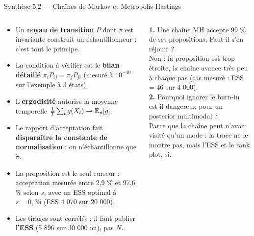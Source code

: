\begin{frame}{Synthèse 5.2 --- Chaînes de Markov et Metropolis-Hastings}
\footnotesize
\begin{columns}[t]
\begin{column}{0.49\textwidth}
\begin{tcolorbox}[enhanced,colback=byPurple!7,colframe=byPurple,arc=2mm,
   title={\bfseries\color{white}\faLightbulb\ Synthèse},colbacktitle=byPurple,
   attach boxed title to top left={xshift=3mm,yshift=-2mm},
   boxed title style={arc=1mm,boxrule=0pt}]
\begin{itemize}
  \item Un \textbf{noyau de transition} $P$ dont $\pi$ est invariante construit un
        échantillonneur : c'est tout le principe.
  \item La condition à vérifier est le \textbf{bilan détaillé}
        $\pi_iP_{ij} = \pi_jP_{ji}$ (mesuré à $10^{-10}$ sur l'exemple à 3 états).
  \item L'\textbf{ergodicité} autorise la moyenne temporelle
        $\frac1T\sum_t g(X_t) \to \mathbb{E}_\pi[g]$.
  \item Le rapport d'acceptation fait \textbf{disparaître la constante de
        normalisation} : on n'échantillonne que $\tilde\pi$.
  \item La proposition est le seul curseur : acceptation mesurée entre 2,9 \% et
        97,6 \% selon $s$, avec un ESS optimal à $s = 0{,}35$ (ESS 4 070 sur 20 000).
  \item Les tirages sont corrélés : il faut publier l'\textbf{ESS} (5 896 sur
        30 000 ici), pas $N$.
\end{itemize}
\end{tcolorbox}
\end{column}
\begin{column}{0.49\textwidth}
\begin{qbox}
\textbf{1.} Une chaîne MH accepte 99 \% de ses propositions. Faut-il s'en réjouir ?
\\ \footnotesize Non : la proposition est trop étroite, la chaîne avance très peu
à chaque pas (cas mesuré : ESS = 46 sur 4 000).\\[0.3mm]
\textbf{2.} Pourquoi ignorer le burn-in est-il dangereux pour un posterior
multimodal ? \\ \footnotesize Parce que la chaîne peut n'avoir visité qu'un mode :
la trace ne le montre pas, mais l'ESS et le rank plot, si.
\end{qbox}
\end{column}
\end{columns}
\end{frame}

